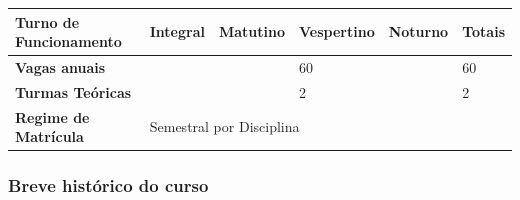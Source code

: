 \begin{table}[h]
\begin{tabular}{|l|l|l|l|l|l|}
\textbf{Turno de Funcionamento} & \textbf{Integral}                     & \textbf{Matutino}                   & \textbf{Vespertino}                   & \textbf{Noturno}                   & \textbf{Totais}                   \\ \hline
\textbf{Vagas anuais}           &                            &                            & 60                             &                           & 60                       \\ \hline
\textbf{Turmas Teóricas}        &                             &                            &  2                            &                           & 2                        \\ \hline
\textbf{Regime de Matrícula}    & \multicolumn{5}{l|}{Semestral por Disciplina}                                                                                                   \\ \hline
\end{tabular}
\end{table}


\subsubsection{Breve histórico do curso}





